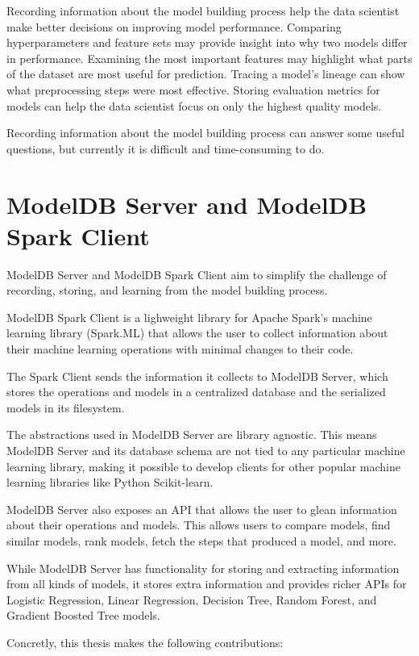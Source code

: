 Recording information about the model building process help the data scientist 
make better decisions on improving model performance. Comparing hyperparameters
and feature sets may provide insight into why two models differ in performance. 
Examining the most important features may highlight what parts of the dataset are
most useful for prediction. Tracing a model's lineage can show what preprocessing
steps were most effective. Storing evaluation metrics for models can help
the data scientist focus on only the highest quality models. 

Recording information about the model building process can answer some useful 
questions, but currently it is difficult and time-consuming to do.

\section{ModelDB Server and ModelDB Spark Client}

ModelDB Server and ModelDB Spark Client aim to simplify the challenge of recording, storing,
and learning from the model building process. 

ModelDB Spark Client is a lighweight library for Apache Spark's machine learning library (Spark.ML) 
that allows the user to collect information about their machine learning operations with minimal changes to their code. 

The Spark Client sends the information it collects to ModelDB Server, which 
stores the operations and models in a centralized database and the serialized 
models in its filesystem. 

The abstractions used in ModelDB Server are library agnostic. This means ModelDB Server 
and its database schema are not tied to any particular machine learning library, making
it possible to develop clients for other popular machine learning libraries like Python Scikit-learn.

ModelDB Server also exposes an API that allows the user to glean information about their
operations and models. This allows users to compare models, find
similar models, rank models, fetch the steps that produced a model, and more. 

While ModelDB Server has functionality for storing and extracting information from
all kinds of models, it stores extra information and provides richer APIs for 
Logistic Regression, Linear Regression, Decision Tree, Random Forest, and 
Gradient Boosted Tree models. 

Concretly, this thesis makes the following contributions:

